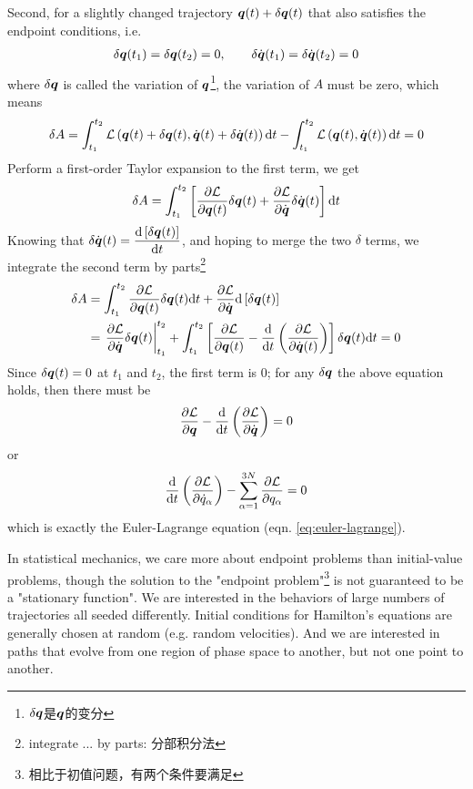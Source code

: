 Second, for a slightly changed trajectory $\boldsymbol{q}(t)+\delta \boldsymbol{q}(t)$ that also satisfies the endpoint conditions, i.e.
\begin{gather}
	\delta\boldsymbol{q}(t_1)=\delta\boldsymbol{q}(t_2)=0,\qquad \delta\dot{\boldsymbol{q}}(t_1)=\delta\dot{\boldsymbol{q}}(t_2)=0
\end{gather}
where $\delta\boldsymbol{q}$ is called the variation of $\boldsymbol{q}$\footnote{$\delta\boldsymbol{q}$是$\boldsymbol{q}$的变分},
the variation of $A$ must be zero, which means
\begin{equation*}
	\delta A=\int_{t_1}^{t_2}\mathcal{L}\left(\boldsymbol{q}(t)+\delta\boldsymbol{q}(t),\dot{\boldsymbol{q}}(t)+\delta\dot{\boldsymbol{q}}(t)\right)\mathrm{d}t
	-\int_{t_1}^{t_2}\mathcal{L}\left(\boldsymbol{q}(t),\dot{\boldsymbol{q}}(t)\right)\mathrm{d}t=0
\end{equation*}
Perform a first-order Taylor expansion to the first term, we get
\begin{equation*}
	\delta A=\int_{t_1}^{t_2}\left[\dfrac{\partial \mathcal{L}}{\partial \boldsymbol{q}(t)}\delta\boldsymbol{q}(t)+\dfrac{\partial \mathcal{L}}{\partial \dot{\boldsymbol{q}}}\delta\dot{\boldsymbol{q}}(t)\right]\mathrm{d}t
\end{equation*}
Knowing that $\delta\dot{\boldsymbol{q}}(t)=\dfrac{\mathrm{d} \left[\delta\boldsymbol{q}(t)\right]}{\mathrm{d} t}$, and hoping to merge the two $\delta$ terms, we integrate the second term by parts\footnote{integrate ... by parts: 分部积分法}
\begin{align}
	\delta A&=\int_{t_1}^{t_2}\dfrac{\partial \mathcal{L}}{\partial \boldsymbol{q}(t)}\delta\boldsymbol{q}(t)\mathrm{d}t+\dfrac{\partial \mathcal{L}}{\partial \dot{\boldsymbol{q}}}\mathrm{d}\left[\delta\boldsymbol{q}(t)\right] \notag\\
	&=\left.\dfrac{\partial \mathcal{L}}{\partial \dot{\boldsymbol{q}}}\delta\boldsymbol{q}(t)\right|_{t_1}^{t_2}+\int_{t_1}^{t_2}\left[\dfrac{\partial \mathcal{L}}{\partial \boldsymbol{q}(t)}-\dfrac{\mathrm{d} }{\mathrm{d} t}\left(\dfrac{\partial \mathcal{L}}{\partial \dot{\boldsymbol{q}}(t)}\right)\right]\delta\boldsymbol{q}(t)\mathrm{d}t=0 \label{eq:deltaA}
\end{align}
Since $\delta\boldsymbol{q}(t)=0$ at $t_1$ and $t_2$, the first term is 0; for any $\delta\boldsymbol{q}$ the above equation holds, then there must be
\begin{equation}
	\dfrac{\partial \mathcal{L}}{\partial \boldsymbol{q}}-\dfrac{\mathrm{d} }{\mathrm{d} t}\left(\dfrac{\partial \mathcal{L}}{\partial \dot{\boldsymbol{q}}}\right)=0
\end{equation}
or 
\begin{equation}
	\dfrac{\mathrm{d} }{\mathrm{d} t}\left(\dfrac{\partial \mathcal{L}}{\partial \dot{q}_\alpha}\right)-\sum_{\alpha=1}^{3N}\dfrac{\partial \mathcal{L}}{\partial q_\alpha}=0
\end{equation}
which is exactly the Euler-Lagrange equation (eqn. \ref{eq:euler-lagrange}).

In statistical mechanics, we care more about endpoint problems than initial-value problems, though the solution to the "endpoint problem"\footnote{相比于初值问题，有两个条件要满足} is not guaranteed to be a "stationary function". We are interested in the behaviors of large numbers of trajectories all seeded differently. Initial conditions for Hamilton's equations are generally chosen at random (e.g. random velocities). And we are interested in paths that evolve from one region of phase space to another, but not one point to another.

